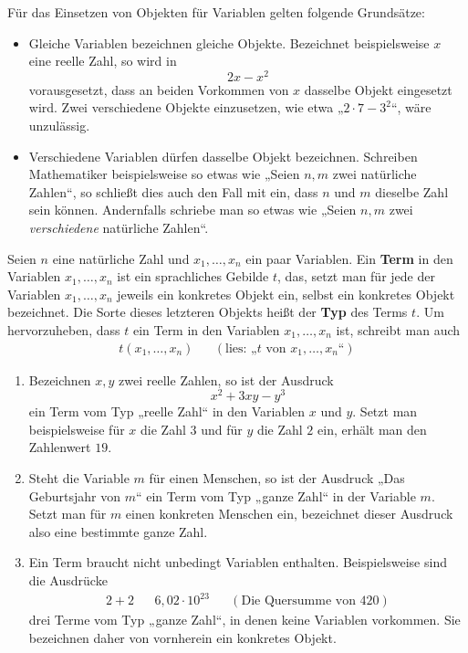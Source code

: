 \begin{bem}
    Für das Einsetzen von Objekten für Variablen gelten folgende Grundsätze:
    \begin{itemize}
        \item Gleiche Variablen bezeichnen gleiche Objekte. Bezeichnet beispielsweise $x$ eine reelle Zahl, so wird in
            \[ 2x-x^2 \]
        vorausgesetzt, dass an beiden Vorkommen von $x$ dasselbe Objekt eingesetzt wird. Zwei verschiedene Objekte einzusetzen, wie etwa „$2\cdot 7 - 3^2$“, wäre unzulässig.
        \item Verschiedene Variablen dürfen dasselbe Objekt bezeichnen. Schreiben Mathematiker beispielsweise so etwas wie „Seien $n,m$ zwei natürliche Zahlen“, so schließt dies auch den Fall mit ein, dass $n$ und $m$ dieselbe Zahl sein können. Andernfalls schriebe man so etwas wie „Seien $n,m$ zwei \emph{verschiedene} natürliche Zahlen“.
    \end{itemize}
\end{bem}


\begin{de}[Term] 
    Seien $n$ eine natürliche Zahl und $x_1,\dots , x_n$ ein paar Variablen. Ein \textbf{Term} in den Variablen $x_1,\dots , x_n$ ist ein sprachliches Gebilde $t$, das, setzt man für jede der Variablen $x_1,\dots ,x_n$ jeweils ein konkretes Objekt ein, selbst ein konkretes Objekt bezeichnet. Die Sorte dieses letzteren Objekts heißt der \textbf{Typ} des Terms $t$. Um hervorzuheben, dass $t$ ein Term in den Variablen $x_1,\dots , x_n$ ist, schreibt man auch
    \begin{align*}
        t(x_1,\dots , x_n) && (\text{lies: „$t$ von $x_1,\dots , x_n$“})
    \end{align*}
\end{de}


\begin{bsp} \quad
    \begin{enumerate}
        \item Bezeichnen $x,y$ zwei reelle Zahlen, so ist der Ausdruck
            \[ x^2+3xy-y^3 \]
        ein Term vom Typ „reelle Zahl“ in den Variablen $x$ und $y$. Setzt man beispielsweise für $x$ die Zahl $3$ und für $y$ die Zahl $2$ ein, erhält man den Zahlenwert $19$.
        \item Steht die Variable $m$ für einen Menschen, so ist der Ausdruck „Das Geburtsjahr von $m$“ ein Term vom Typ „ganze Zahl“ in der Variable $m$. Setzt man für $m$ einen konkreten Menschen ein, bezeichnet dieser Ausdruck also eine bestimmte ganze Zahl.
        \item Ein Term braucht nicht unbedingt Variablen enthalten. Beispielsweise sind die Ausdrücke
        \begin{align*}
             2+2 && 6{,}02\cdot 10^{23} && (\text{Die Quersumme von $420$})
        \end{align*}
        drei Terme vom Typ „ganze Zahl“, in denen keine Variablen vorkommen. Sie bezeichnen daher von vornherein ein konkretes Objekt.
    \end{enumerate}
\end{bsp}


